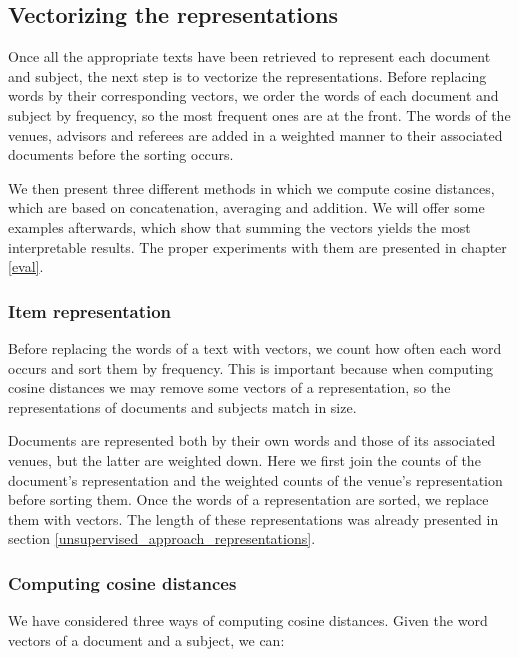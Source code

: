 \subsection{Vectorizing the representations} \label{unsupervised_approach_vectorization}

Once all the appropriate texts have been retrieved to represent each document and subject, the next step is to vectorize the representations. Before replacing words by their corresponding vectors, we order the words of each document and subject by frequency, so the most frequent ones are at the front. The words of the venues, advisors and referees are added in a weighted manner to their associated documents before the sorting occurs.

We then present three different methods in which we compute cosine distances, which are based on concatenation, averaging and addition. We will offer some examples afterwards, which show that summing the vectors yields the most interpretable results. The proper experiments with them are presented in chapter \ref{eval}.

\subsubsection{Item representation} \label{unsupervised_approach_our_representation}

Before replacing the words of a text with vectors, we count how often each word occurs and sort them by frequency. This is important because when computing cosine distances we may remove some vectors of a representation, so the representations of documents and subjects match in size.

Documents are represented both by their own words and those of its associated venues, but the latter are weighted down. Here we first join the counts of the document's representation and the weighted counts of the venue's representation before sorting them. Once the words of a representation are sorted, we replace them with vectors. The length of these representations was already presented in section \ref{unsupervised_approach_representations}.

\subsubsection{Computing cosine distances}

We have considered three ways of computing cosine distances. Given the word vectors of a document and a subject, we can:

